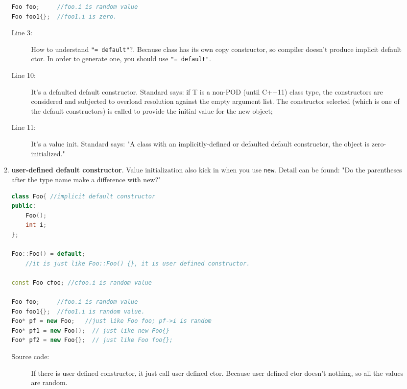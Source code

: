 \documentclass[a4paper,11pt,twoside]{book}
\begin{document}
\begin{itemize}
\begin{enumerate}
\begin{lstlisting}[frame=single, language=c++]
Foo foo;     //foo.i is random value
Foo foo1{};	 //foo1.i is zero.		 
\end{lstlisting}
\begin{description}			
	\item[Line 3:]  How to understand \texttt{"= default"}?. Because class has its own copy constructor, so compiler doesn't produce implicit default ctor. In order to generate one, you should use \texttt{"= default"}.
	
	\item[Line 10:] It's a defaulted default constructor.  Standard says: if T is a non-POD (until C++11) class type, the constructors are considered and subjected to overload resolution against the empty argument list. The constructor selected (which is one of the default constructors) is called to provide the initial value for the new object;
	
	\item[Line 11:] It's a value init. Standard says: "A class with an implicitly-defined or defaulted default constructor, the object is zero-initialized."
\end{description}


		\item \textbf{user-defined default constructor}. Value initialization also kick in when you use \texttt{new}. Detail can be found: "Do the parentheses after the type name make a difference with new?"
\begin{lstlisting}[frame=single, language=c++]
class Foo{ //implicit default constructor
public:
	Foo();
	int i;
};

Foo::Foo() = default; 
    //it is just like Foo::Foo() {}, it is user defined constructor.
			
const Foo cfoo; //cfoo.i is random value 
			
Foo foo;     //foo.i is random value
Foo foo1{};	 //foo1.i is random value.	
Foo* pf = new Foo;   //just like Foo foo; pf->i is random 
Foo* pf1 = new Foo();  // just like new Foo{}
Foo* pf2 = new Foo{};  // just like Foo foo{};		 
\end{lstlisting}
\begin{description}			
	\item[Source code:] If there is user defined constructor, it just call user defined ctor. Because user defined ctor doesn't nothing, so all the values are random.
\end{description}

	\end{enumerate}
		

\end{itemize}
\end{document}
